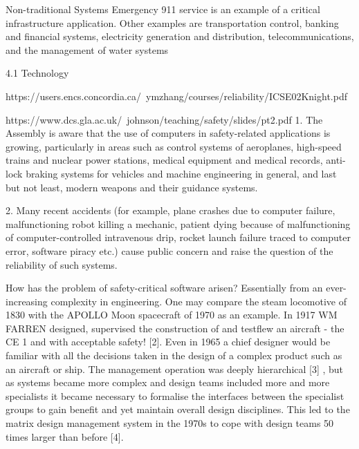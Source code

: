 Non-traditional Systems
Emergency 911 service is an example of a critical infrastructure
application. Other examples are transportation control, banking
and financial systems, electricity generation and distribution, telecommunications, and the management of water systems

4.1 Technology

https://users.encs.concordia.ca/~ymzhang/courses/reliability/ICSE02Knight.pdf
\cite{knightchallengessafetyCritical}

https://www.dcs.gla.ac.uk/~johnson/teaching/safety/slides/pt2.pdf
\cite{johnson2006devsafetycritical}
\cite{daucriticalsafetyconsider}
\cite{fallsafedesign}
\cite{arForce2015VerificationExpectations}
\cite{nebulaassessment}
\cite{lalaArchitecturalPrinciples}
\cite{mitNotesSafetyCritical}
\cite{britishColumbia2020GuideSafetyCritical}
1.       The Assembly is aware that the use of computers in safety-related applications is growing, particularly in areas such as control systems of aeroplanes, high-speed trains and nuclear power stations, medical equipment and medical records, anti-lock braking systems for vehicles and machine engineering in general, and last but not least, modern weapons and their guidance systems.

2.       Many recent accidents (for example, plane crashes due to computer failure, malfunctioning robot killing a mechanic, patient dying because of malfunctioning of computer-controlled intravenous drip, rocket launch failure traced to computer error, software piracy etc.) cause public concern and raise the question of the reliability of such systems.


How has the problem of safety-critical software arisen? Essentially from an ever-increasing complexity in engineering. One may compare the steam locomotive of 1830 with the APOLLO Moon spacecraft of 1970 as an example. In 1917 WM FARREN designed, supervised the construction of and testflew an aircraft - the CE 1 and with acceptable safety! [2]. Even in 1965 a chief designer would be familiar with all the decisions taken in the design of a complex product such as an aircraft or ship. The management operation was deeply hierarchical [3] , but as systems became more complex and design teams included more and more specialists it became necessary to formalise the interfaces between the specialist groups to gain benefit and yet maintain overall design disciplines. This led to the matrix design management system in the 1970s to cope with design teams 50 times larger than before [4].

